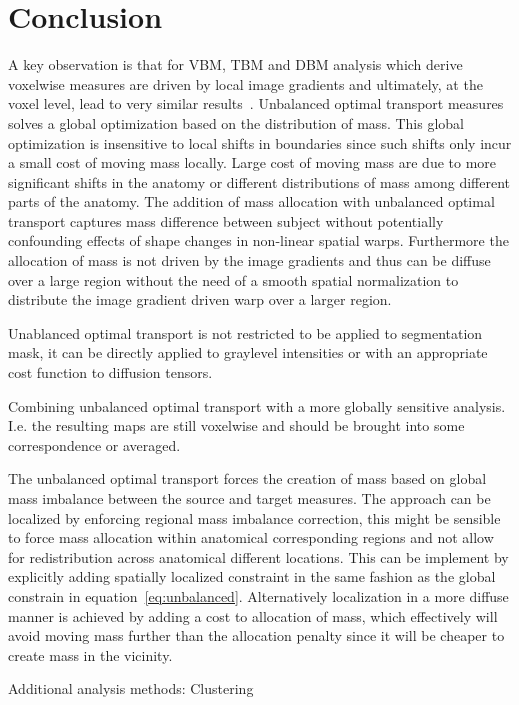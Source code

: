 \documentclass{llncs}
\begin{document}
\section{Conclusion}
A key observation is that for VBM, TBM and DBM analysis which derive voxelwise
measures are driven by local image gradients and ultimately, at the voxel
level, lead to very similar results~\cite[Chaper~6]{frackowiak2004human}.
Unbalanced optimal transport measures solves a global optimization based on the
distribution of mass. This global optimization  is insensitive to local shifts
in boundaries since such shifts only incur a small cost of moving mass locally.
Large cost of moving mass are due to more significant shifts in the anatomy or
different distributions of mass among different parts of the anatomy. The
addition of mass allocation with unbalanced optimal transport captures mass
difference between subject without potentially confounding effects of shape
changes in non-linear spatial warps. Furthermore the allocation of mass is not
driven by the image gradients and thus can be diffuse over a large region
without the need of a smooth spatial normalization to distribute the image
gradient driven warp over a larger region.

Unablanced optimal transport is not restricted to be applied to segmentation
mask, it can be directly applied to graylevel intensities or with an
appropriate cost function to diffusion tensors. 


Combining unbalanced optimal transport with a more globally sensitive analysis.
I.e. the resulting maps are still voxelwise and should be brought into some
correspondence or averaged.

The unbalanced optimal transport forces the creation of mass based on global
mass imbalance between the source and target measures. The approach can be
localized by enforcing regional mass imbalance correction, this might be
sensible to force mass allocation within anatomical corresponding regions and not
allow for redistribution across anatomical different locations. This can be
implement by explicitly adding spatially localized constraint in the same
fashion as the global constrain in equation~\ref{eq:unbalanced}. Alternatively
localization in a more diffuse manner is achieved by adding a cost to
allocation of mass, which effectively will avoid moving mass further than the
allocation penalty since it will be cheaper to create mass in the vicinity.

Additional analysis methods: Clustering



\end{document}
